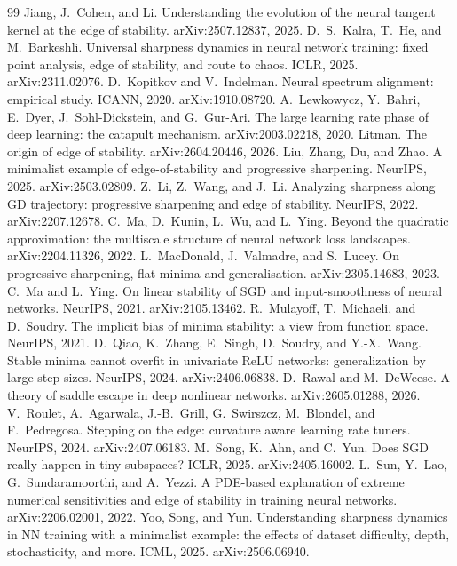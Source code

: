 \documentclass[11pt]{article}
\theoremstyle{definition}
\theoremstyle{remark}
\begin{document}
\begin{thebibliography}{99}
 Jiang, J.~Cohen, and Li. Understanding the evolution of the neural tangent kernel at the edge of stability. arXiv:2507.12837, 2025.
 D.~S.~Kalra, T.~He, and M.~Barkeshli. Universal sharpness dynamics in neural network training: fixed point analysis, edge of stability, and route to chaos. ICLR, 2025. arXiv:2311.02076.
 D.~Kopitkov and V.~Indelman. Neural spectrum alignment: empirical study. ICANN, 2020. arXiv:1910.08720.
 A.~Lewkowycz, Y.~Bahri, E.~Dyer, J.~Sohl-Dickstein, and G.~Gur-Ari. The large learning rate phase of deep learning: the catapult mechanism. arXiv:2003.02218, 2020.
 Litman. The origin of edge of stability. arXiv:2604.20446, 2026.
 Liu, Zhang, Du, and Zhao. A minimalist example of edge-of-stability and progressive sharpening. NeurIPS, 2025. arXiv:2503.02809.
 Z.~Li, Z.~Wang, and J.~Li. Analyzing sharpness along GD trajectory: progressive sharpening and edge of stability. NeurIPS, 2022. arXiv:2207.12678.
 C.~Ma, D.~Kunin, L.~Wu, and L.~Ying. Beyond the quadratic approximation: the multiscale structure of neural network loss landscapes. arXiv:2204.11326, 2022.
 L.~MacDonald, J.~Valmadre, and S.~Lucey. On progressive sharpening, flat minima and generalisation. arXiv:2305.14683, 2023.
 C.~Ma and L.~Ying. On linear stability of SGD and input-smoothness of neural networks. NeurIPS, 2021. arXiv:2105.13462.
 R.~Mulayoff, T.~Michaeli, and D.~Soudry. The implicit bias of minima stability: a view from function space. NeurIPS, 2021.
 D.~Qiao, K.~Zhang, E.~Singh, D.~Soudry, and Y.-X.~Wang. Stable minima cannot overfit in univariate ReLU networks: generalization by large step sizes. NeurIPS, 2024. arXiv:2406.06838.
 D.~Rawal and M.~DeWeese. A theory of saddle escape in deep nonlinear networks. arXiv:2605.01288, 2026.
 V.~Roulet, A.~Agarwala, J.-B.~Grill, G.~Swirszcz, M.~Blondel, and F.~Pedregosa. Stepping on the edge: curvature aware learning rate tuners. NeurIPS, 2024. arXiv:2407.06183.
 M.~Song, K.~Ahn, and C.~Yun. Does SGD really happen in tiny subspaces? ICLR, 2025. arXiv:2405.16002.
 L.~Sun, Y.~Lao, G.~Sundaramoorthi, and A.~Yezzi. A PDE-based explanation of extreme numerical sensitivities and edge of stability in training neural networks. arXiv:2206.02001, 2022.
 Yoo, Song, and Yun. Understanding sharpness dynamics in NN training with a minimalist example: the effects of dataset difficulty, depth, stochasticity, and more. ICML, 2025. arXiv:2506.06940.

\end{thebibliography}
\end{document}
